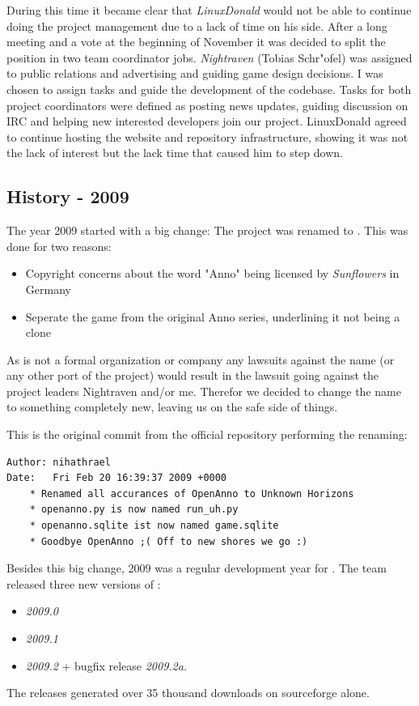 During this time it became clear that \textit{LinuxDonald} would not be able to continue doing the project management
due to a lack of time on his side. After a long meeting and a vote at the beginning of November it was decided to split the
position in two team coordinator jobs. \textit{Nightraven} (Tobias Schr"ofel) was assigned to public relations and
advertising and guiding game design decisions. I was chosen to assign tasks and guide the development of the codebase.
Tasks for both project coordinators were defined as posting news updates, guiding discussion on IRC and helping new
interested developers join our project. LinuxDonald agreed to continue hosting the website and repository
infrastructure, showing it was not the lack of interest but the lack time that caused him to step down.

\subsection{History - 2009}
The year 2009 started with a big change: The project was renamed to \UH{}. This was done for two reasons:
\begin{itemize}
    \item Copyright concerns about the word "Anno" being licensed by \textit{Sunflowers} in Germany
    \item Seperate the game from the original Anno series, underlining it not being a clone
\end{itemize}

As \UH{} is not a formal organization or company any lawsuits against the name (or any other port of the project) would
result in the lawsuit going against the project leaders Nightraven and/or me. Therefor we decided to change the name to
something completely new, leaving us on the safe side of things.

This is the original commit from the official repository performing the renaming:
\begin{lstlisting}[caption=Commit 1831 renaming OpenAnno to Unknown Horizons, label=renamecommit]
Author: nihathrael
Date:   Fri Feb 20 16:39:37 2009 +0000
    * Renamed all accurances of OpenAnno to Unknown Horizons
    * openanno.py is now named run_uh.py
    * openanno.sqlite ist now named game.sqlite
    * Goodbye OpenAnno ;( Off to new shores we go :)
\end{lstlisting}

Besides this big change, 2009 was a regular development year for \UH{}. The team released three new versions of \UH{}:
\begin{itemize}
\item \textit{2009.0}
\item \textit{2009.1}
\item \textit{2009.2} + bugfix release \textit{2009.2a}. 
\end{itemize}
The releases generated over 35 thousand downloads on sourceforge alone.


